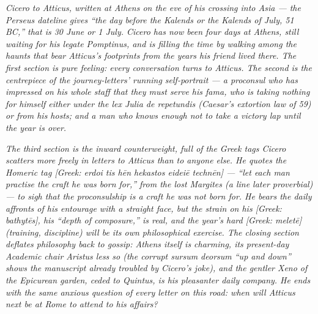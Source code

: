 
\textit{Cicero to Atticus, written at Athens on the eve of his
crossing into Asia --- the Perseus dateline gives ``the day
before the Kalends or the Kalends of July, 51 BC,'' that
is 30 June or 1 July. Cicero has now been four days at
Athens, still waiting for his legate Pomptinus, and is
filling the time by walking among the haunts that bear
Atticus's footprints from the years his friend lived there.
The first section is pure feeling: every conversation
turns to Atticus. The second is the centrepiece of the
journey-letters' running self-portrait --- a proconsul who
has impressed on his whole staff that they must serve his
\textit{fama}, who is taking nothing for himself either
under the lex Julia de repetundis (Caesar's extortion law
of 59) or from his hosts; and a man who knows enough not
to take a victory lap until the year is over.}

\textit{The third section is the inward counterweight, full of
the Greek tags Cicero scatters more freely in letters to
Atticus than to anyone else. He quotes the Homeric tag
\textit{[Greek: erdoi tis hēn hekastos eideiē technēn]} ---
``let each man practise the craft he was born for,'' from
the lost \textit{Margites} (a line later proverbial) --- to
sigh that the proconsulship is a craft he was not born
for. He bears the daily affronts of his entourage with a
straight face, but the strain on his \textit{[Greek:
bathytēs]}, his ``depth of composure,'' is real, and the
year's hard \textit{[Greek: meletē]} (training, discipline)
will be its own philosophical exercise. The closing
section deflates philosophy back to gossip: Athens itself is
charming, its present-day Academic chair Aristus less so
(the corrupt \textit{sursum deorsum} ``up and down'' shows
the manuscript already troubled by Cicero's joke), and the
gentler Xeno of the Epicurean garden, ceded to Quintus, is
his pleasanter daily company. He ends with the same anxious
question of every letter on this road: when will Atticus
next be at Rome to attend to his affairs?}
